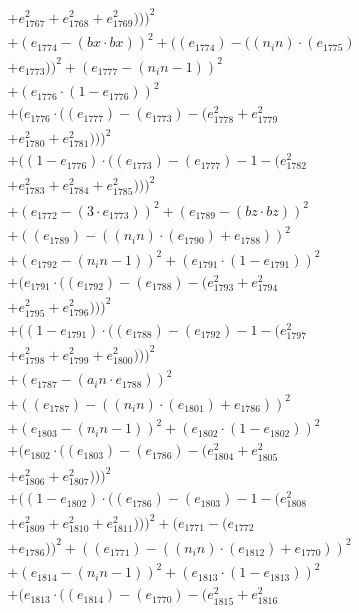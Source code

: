 \documentclass[10pt, a4paper]{article}
\begin{document}
\begin{small}
\begin{align*}
& + e_{1767}^{2} + e_{1768}^{2} + e_{1769}^{2})))^{2} \\
& + (e_{1774} - (bx  \cdot  bx))^{2} + ((e_{1774}) - ((n_in)  \cdot  (e_{1775}) \\
& + e_{1773}))^{2} + (e_{1777} - (n_in - 1))^{2} \\
& + (e_{1776}  \cdot  (1 - e_{1776}))^{2} \\
& + (e_{1776}  \cdot  ((e_{1777}) - (e_{1773}) - (e_{1778}^{2} + e_{1779}^{2} \\
& + e_{1780}^{2} + e_{1781}^{2})))^{2} \\
& + ((1 - e_{1776})  \cdot  ((e_{1773}) - (e_{1777}) - 1 - (e_{1782}^{2} \\
& + e_{1783}^{2} + e_{1784}^{2} + e_{1785}^{2})))^{2} \\
& + (e_{1772} - (3  \cdot  e_{1773}))^{2} + (e_{1789} - (bz  \cdot  bz))^{2} \\
& + ((e_{1789}) - ((n_in)  \cdot  (e_{1790}) + e_{1788}))^{2} \\
& + (e_{1792} - (n_in - 1))^{2} + (e_{1791}  \cdot  (1 - e_{1791}))^{2} \\
& + (e_{1791}  \cdot  ((e_{1792}) - (e_{1788}) - (e_{1793}^{2} + e_{1794}^{2} \\
& + e_{1795}^{2} + e_{1796}^{2})))^{2} \\
& + ((1 - e_{1791})  \cdot  ((e_{1788}) - (e_{1792}) - 1 - (e_{1797}^{2} \\
& + e_{1798}^{2} + e_{1799}^{2} + e_{1800}^{2})))^{2} \\
& + (e_{1787} - (a_in  \cdot  e_{1788}))^{2} \\
& + ((e_{1787}) - ((n_in)  \cdot  (e_{1801}) + e_{1786}))^{2} \\
& + (e_{1803} - (n_in - 1))^{2} + (e_{1802}  \cdot  (1 - e_{1802}))^{2} \\
& + (e_{1802}  \cdot  ((e_{1803}) - (e_{1786}) - (e_{1804}^{2} + e_{1805}^{2} \\
& + e_{1806}^{2} + e_{1807}^{2})))^{2} \\
& + ((1 - e_{1802})  \cdot  ((e_{1786}) - (e_{1803}) - 1 - (e_{1808}^{2} \\
& + e_{1809}^{2} + e_{1810}^{2} + e_{1811}^{2})))^{2} + (e_{1771} - (e_{1772} \\
& + e_{1786}))^{2} + ((e_{1771}) - ((n_in)  \cdot  (e_{1812}) + e_{1770}))^{2} \\
& + (e_{1814} - (n_in - 1))^{2} + (e_{1813}  \cdot  (1 - e_{1813}))^{2} \\
& + (e_{1813}  \cdot  ((e_{1814}) - (e_{1770}) - (e_{1815}^{2} + e_{1816}^{2} \\

\end{align*}
\end{small}
\end{document}
